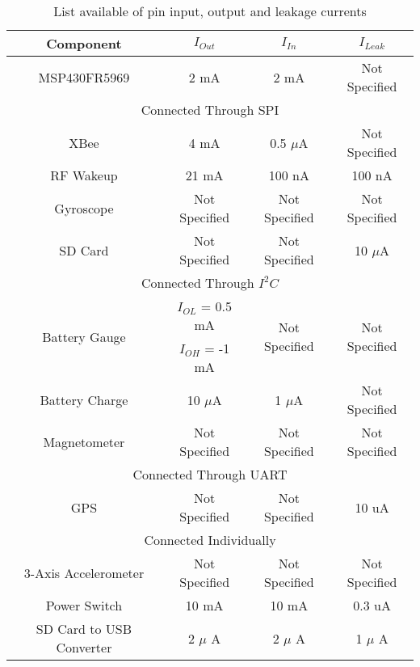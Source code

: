 \begin{table}[H]
  \centering
  \caption{List available of pin input, output and leakage currents}
    \begin{tabular}{|c|c|c|c|}
    \hline
    \rowcolor{Gray}
    Component & $I_{Out}$  & $I_{In}$   & $I_{Leak}$ \\
    \hline\hline
    MSP430FR5969 & 2 mA  & 2 mA  & Not Specified \\ \hline


    \multicolumn{4}{|c|}{\cellcolor{Gray}Connected Through SPI} \\ \hline
    XBee  & 4 mA  & 0.5 $\mu$A & Not Specified \\ \hline
    RF Wakeup & 21 mA  & 100 nA & 100 nA \\ \hline
    Gyroscope & Not Specified & Not Specified & Not Specified \\ \hline
    SD Card & Not Specified & Not Specified & 10 $\mu$A \\ \hline

    \multicolumn{4}{|c|}{\cellcolor{Gray}Connected Through $I^2C$} \\ \hline
    \multirow{2}{*}{Battery Gauge} & $I_{OL}$ = 0.5 mA & \multirow{2}{*}{Not Specified} & \multirow{2}{*}{Not Specified} \\
    & $I_{OH}$ = -1 mA & &\\ \hline
    Battery Charge & 10 $\mu$A  & 1 $\mu$A  & Not Specified \\ \hline
    Magnetometer & Not Specified & Not Specified & Not Specified \\ \hline
  
  	
    \multicolumn{4}{|c|}{\cellcolor{Gray}Connected Through UART} \\ \hline
    GPS   & Not Specified & Not Specified & 10 uA \\ \hline
   

    \multicolumn{4}{|c|}{\cellcolor{Gray}Connected Individually} \\ \hline
    3-Axis Accelerometer & Not Specified & Not Specified & Not Specified \\ \hline
    Power Switch & 10 mA & 10 mA & 0.3 uA \\ \hline
 	SD Card to USB Converter &  2 $\mu$ A     &    2 $\mu$ A      &  1 $\mu$ A   \\
    \hline
    \end{tabular}%
  \label{tab:drivingCap}
\end{table}%


